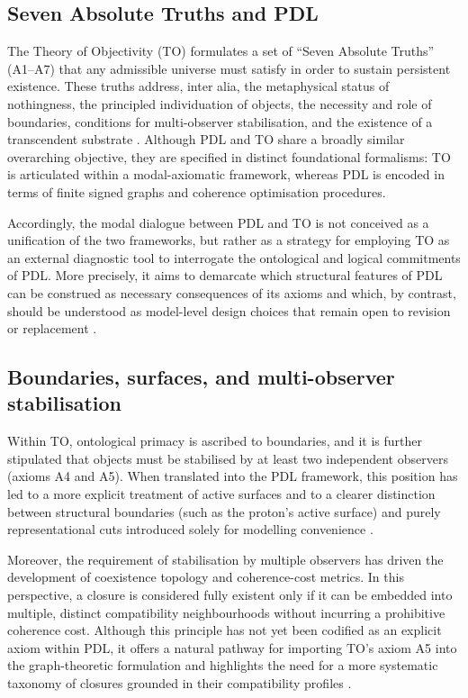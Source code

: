 \documentclass[11pt,a4paper]{article}
\begin{document}
\subsection{Seven Absolute Truths and PDL}
\label{subsec:TO_Axioms}

The Theory of Objectivity (TO) formulates a set of “Seven Absolute Truths” (A1–A7) that any admissible universe must satisfy in order to sustain persistent existence. These truths address, inter alia, the metaphysical status of nothingness, the principled individuation of objects, the necessity and role of boundaries, conditions for multi-observer stabilisation, and the existence of a transcendent substrate \citep{PDL_TO_dialogue}. Although PDL and TO share a broadly similar overarching objective, they are specified in distinct foundational formalisms: TO is articulated within a modal-axiomatic framework, whereas PDL is encoded in terms of finite signed graphs and coherence optimisation procedures.

Accordingly, the modal dialogue between PDL and TO is not conceived as a unification of the two frameworks, but rather as a strategy for employing TO as an external diagnostic tool to interrogate the ontological and logical commitments of PDL. More precisely, it aims to demarcate which structural features of PDL can be construed as necessary consequences of its axioms and which, by contrast, should be understood as model-level design choices that remain open to revision or replacement \citep{PDL_TO_dialogue,PDL_position}.

\subsection{Boundaries, surfaces, and multi-observer stabilisation}
\label{subsec:boundaries_multiobserver}

Within TO, ontological primacy is ascribed to boundaries, and it is further stipulated that objects must be stabilised by at least two independent observers (axioms A4 and A5). When translated into the PDL framework, this position has led to a more explicit treatment of active surfaces and to a clearer distinction between structural boundaries (such as the proton’s active surface) and purely representational cuts introduced solely for modelling convenience \citep{PDL_TO_dialogue,PDL_Main_2026}.

Moreover, the requirement of stabilisation by multiple observers has driven the development of coexistence topology and coherence-cost metrics. In this perspective, a closure is considered fully existent only if it can be embedded into multiple, distinct compatibility neighbourhoods without incurring a prohibitive coherence cost. Although this principle has not yet been codified as an explicit axiom within PDL, it offers a natural pathway for importing TO’s axiom A5 into the graph-theoretic formulation and highlights the need for a more systematic taxonomy of closures grounded in their compatibility profiles \citep{Coherence_Leakage_18_2026,PDL_position}.
\end{document}
